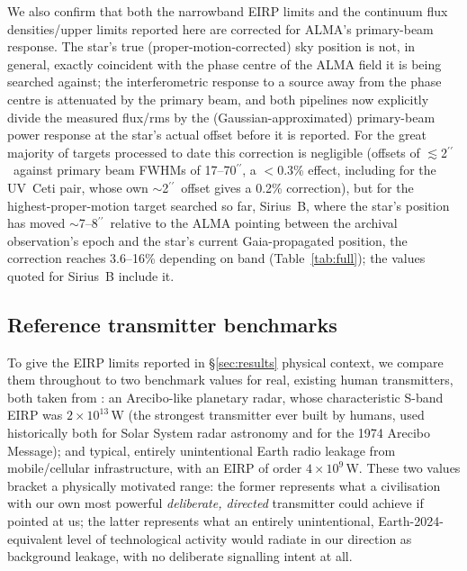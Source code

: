 \documentclass{openjournal}
\begin{document}
We also confirm that both the narrowband EIRP limits and the continuum
flux densities/upper limits reported here are corrected for ALMA's
primary-beam response. The star's true (proper-motion-corrected) sky
position is not, in general, exactly coincident with the phase centre of
the ALMA field it is being searched against; the interferometric
response to a source away from the phase centre is attenuated by the
primary beam, and both pipelines now explicitly divide the measured
flux/rms by the (Gaussian-approximated) primary-beam power response at
the star's actual offset before it is reported. For the great majority of
targets processed to date this correction is negligible (offsets of
$\lesssim$2\hbox{$^{\prime\prime}$}\ against primary beam FWHMs of
17--70\hbox{$^{\prime\prime}$}, a $<$0.3\% effect, including for the
UV~Ceti pair, whose own $\sim$2\hbox{$^{\prime\prime}$}\ offset gives a
0.2\% correction), but for the highest-proper-motion target searched so
far, Sirius~B, where the star's position has moved $\sim$7--8\hbox{$^{\prime\prime}$}\
relative to the ALMA pointing between the archival observation's epoch
and the star's current Gaia-propagated position, the correction reaches
3.6--16\% depending on band (Table~\ref{tab:full}); the values quoted
for Sirius~B include it.

\subsection{Reference transmitter benchmarks}
\label{sec:benchmarks}

To give the EIRP limits reported in \S\ref{sec:results} physical context,
we compare them throughout to two benchmark values for real, existing
human transmitters, both taken from \citet{EarthDetectingEarth2025}: an
Arecibo-like planetary radar, whose characteristic S-band EIRP was
$2\times10^{13}$\,W (the strongest transmitter ever built by humans,
used historically both for Solar System radar astronomy and for the 1974
Arecibo Message); and typical, entirely unintentional Earth radio
leakage from mobile/cellular infrastructure, with an EIRP of order
$4\times10^{9}$\,W. These two values bracket a physically motivated
range: the former represents what a civilisation with our own most
powerful \emph{deliberate, directed} transmitter could achieve if
pointed at us; the latter represents what an entirely unintentional,
Earth-2024-equivalent level of technological activity would radiate in
our direction as background leakage, with no deliberate signalling
intent at all.
\end{document}
